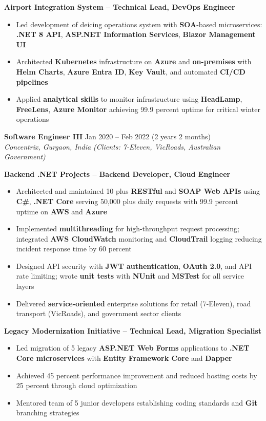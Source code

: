 \documentclass[10pt,a4paper]{article}
\newcommand{\jobentry}[3]{%
    \vspace{4pt}
    {\normalsize\bfseries #1} \hfill #2\\
    \textit{#3}
}
\begin{document}
\textbf{Airport Integration System -- Technical Lead, DevOps Engineer}
\begin{itemize}
    \item Led development of deicing operations system with \textbf{SOA}-based microservices: \textbf{.NET 8 API}, \textbf{ASP.NET Information Services}, \textbf{Blazor Management UI}
    \item Architected \textbf{Kubernetes} infrastructure on \textbf{Azure} and \textbf{on-premises} with \textbf{Helm Charts}, \textbf{Azure Entra ID}, \textbf{Key Vault}, and automated \textbf{CI/CD pipelines}
    \item Applied \textbf{analytical skills} to monitor infrastructure using \textbf{HeadLamp}, \textbf{FreeLens}, \textbf{Azure Monitor} achieving 99.9 percent uptime for critical winter operations
\end{itemize}

\jobentry{Software Engineer III}{Jan 2020 -- Feb 2022 (2 years 2 months)}{Concentrix, Gurgaon, India (Clients: 7-Eleven, VicRoads, Australian Government)}

\textbf{Backend .NET Projects -- Backend Developer, Cloud Engineer}
\begin{itemize}
    \item Architected and maintained 10 plus \textbf{RESTful} and \textbf{SOAP Web APIs} using \textbf{C\#}, \textbf{.NET Core} serving 50,000 plus daily requests with 99.9 percent uptime on \textbf{AWS} and \textbf{Azure}
    \item Implemented \textbf{multithreading} for high-throughput request processing; integrated \textbf{AWS CloudWatch} monitoring and \textbf{CloudTrail} logging reducing incident response time by 60 percent
    \item Designed API security with \textbf{JWT authentication}, \textbf{OAuth 2.0}, and API rate limiting; wrote \textbf{unit tests} with \textbf{NUnit} and \textbf{MSTest} for all service layers
    \item Delivered \textbf{service-oriented} enterprise solutions for retail (7-Eleven), road transport (VicRoads), and government sector clients
\end{itemize}

\textbf{Legacy Modernization Initiative -- Technical Lead, Migration Specialist}
\begin{itemize}
    \item Led migration of 5 legacy \textbf{ASP.NET Web Forms} applications to \textbf{.NET Core microservices} with \textbf{Entity Framework Core} and \textbf{Dapper}
    \item Achieved 45 percent performance improvement and reduced hosting costs by 25 percent through cloud optimization
    \item Mentored team of 5 junior developers establishing coding standards and \textbf{Git} branching strategies
\end{itemize}
\end{document}

